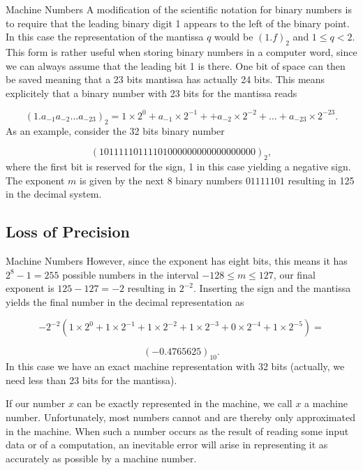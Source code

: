 \documentclass[%
oneside,                 %
final,                   %
10pt]{article}
\begin{document}
\begin{block}{Machine Numbers }
A modification of the scientific notation for binary numbers is to
require that the leading binary digit 1 appears to the left of the binary point.
In this case the representation of the mantissa $q$ would be
$(1.f)_2$ and $ 1 \le q < 2$. This form is rather useful when storing
binary numbers in a computer word, since we can always assume that the leading
bit 1 is there. One bit of space can then be saved meaning that a 23 bits
mantissa has actually 24 bits. This means explicitely that a binary number with 23 bits
for the mantissa reads

\begin{equation}
(1.a_{-1}a_{-2}\dots a_{-23})_2=1\times 2^0+a_{-1}\times 2^{-1}+
+a_{-2}\times 2^{-2}+\dots+a_{-23}\times 2^{-23}.
\end{equation}
As an example, consider the 32 bits binary number

\[
(10111110111101000000000000000000)_2,
\]
where the first bit is reserved for the sign, 1 in this case yielding a
negative sign. The exponent $m$ is given by the next 8 binary numbers
$01111101$ resulting in 125 in the decimal system.
\end{block}

\subsection{Loss of Precision}

\begin{block}{Machine Numbers }
However, since the
exponent has eight bits, this means it has  $2^8-1=255$ possible numbers in the interval
$-128 \le m \le 127$, our final
exponent is $125-127=-2$ resulting in $2^{-2}$.
Inserting the sign and the mantissa yields the final number in the decimal representation as

\[
 -2^{-2}\left(1\times 2^0+1\times 2^{-1}+
1\times 2^{-2}+1\times 2^{-3}+0\times 2^{-4}+1\times 2^{-5}\right)=\]

\[
(-0.4765625)_{10}.
\]
In this case we have an exact machine representation with 32 bits (actually, we need less than
23 bits for the mantissa).

If our number $x$ can be exactly represented in the machine, we call
$x$ a machine number. Unfortunately, most numbers cannot  and are thereby
only approximated in the machine. When such a number occurs as the result
of reading some input data or of a computation, an inevitable error
will arise in representing it as accurately as possible by
a machine number.
\end{block}
\end{document}
